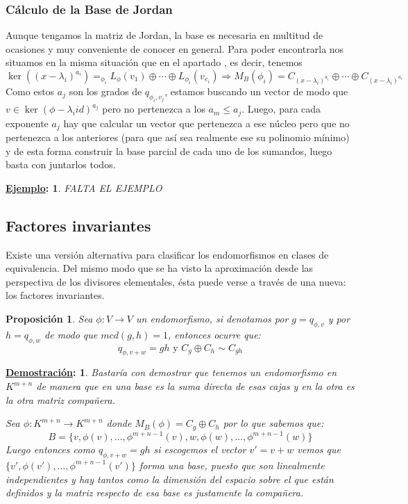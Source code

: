 \documentclass[10pt,a4paper,openright]{book}
\theoremstyle{break}
\newtheorem*{prop}{Proposición}
\newtheorem*{demo}{\underline{Demostración}:}
\newtheorem*{ej}{\underline{Ejemplo}:}
\begin{document}
\subsubsection{Cálculo de la Base de Jordan}
Aunque tengamos la matriz de Jordan, la base es necesaria en multitud de ocasiones y muy conveniente de conocer en general. Para poder encontrarla nos situamos en la misma situación que en el apartado , es decir, tenemos
$$\ker\left((x-\lambda_i)^{a_i}\right) =_{\phi_i} L_\phi(v_1)\oplus \cdots \oplus L_{\phi_i}(v_{e_i}) \Rightarrow M_B(\phi_i) = C_{(x-\lambda_i)^{a_i}} \oplus \cdots \oplus C_{(x-\lambda_i)^{a_r}}$$
Como estos $a_j$ son los grados de $q_{\phi_i, v_j}$, estamos buscando un vector de modo que $v\in \ker\left(\phi - \lambda_i id\right)^{a_j}$ pero no pertenezca a los $a_m \leq a_j$. Luego, para cada exponente $a_j$ hay que calcular un vector que pertenezca a ese núcleo pero que no pertenezca a los anteriores (para que así sea realmente ese su polinomio mínimo) y de esta forma construir la base parcial de cada uno de los sumandos, luego basta con juntarlos todos.

\begin{ej}
FALTA EL EJEMPLO
\end{ej}

\subsection{Factores invariantes}
Existe una versión alternativa para clasificar los endomorfismos en clases de equivalencia. Del mismo modo que se ha visto la aproximación desde las perspectiva de los divisores elementales, ésta puede verse a través de una nueva: los factores invariantes.

\begin{prop}
Sea $\phi:V\rightarrow V$ un endomorfismo, si denotamos por $g = q_{\phi,v}$ y por $h = q_{\phi, w}$ de modo que $mcd(g,h)=1$, entonces ocurre que:
$$q_{\phi, v+w}=gh \mbox{ y } C_{g}\oplus C_{h} \sim C_{gh}$$
\end{prop}
\begin{demo}
Bastaría con demostrar que tenemos un endomorfismo en $K^{m+n}$ de manera que en una base es la suma directa de esas cajas y en la otra es la otra matriz compañera.

Sea $\phi: K^{m+n}\rightarrow K^{m+n}$ donde $M_B(\phi) = C_{g}\oplus C_{h}$ por lo que sabemos que:
$$B=\{v, \phi(v), \ldots, \phi^{m+n-1}(v), w, \phi(w), \ldots, \phi^{m+n-1}(w)\}$$
Luego entonces como $q_{\phi, v+w}=gh$ si escogemos el vector $v'=v+w$ vemos que $\{v', \phi(v'), \ldots, \phi^{m+n-1}(v')\}$ forma una base, puesto que son linealmente independientes y hay tantos como la dimensión del espacio sobre el que están definidos y la matriz respecto de esa base es justamente la compañera.
\end{demo}
\end{document}

